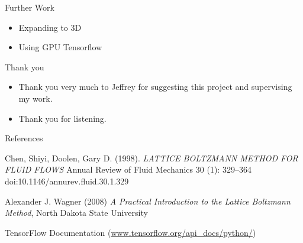 \documentclass{beamer}
\begin{document}
\begin{frame}{Further Work}

\begin{itemize}
    \item Expanding to 3D
    \item Using GPU Tensorflow
\end{itemize}

\end{frame}


\begin{frame}{Thank you}

\begin{itemize}
    \item Thank you very much to Jeffrey for suggesting this project and supervising my work.
    \item Thank you for listening.
\end{itemize}

\end{frame}


\begin{frame}{References}

\begin{thebibliography}{}\tiny

 Chen, Shiyi, Doolen, Gary D. (1998). \emph{LATTICE BOLTZMANN METHOD FOR FLUID FLOWS} Annual Review of Fluid Mechanics 30 (1): 329–364 doi:10.1146/annurev.fluid.30.1.329

 Alexander J. Wagner (2008) \emph{A Practical Introduction to the Lattice Boltzmann Method}, North Dakota State University

 TensorFlow Documentation (\url{www.tensorflow.org/api_docs/python/})

\end{thebibliography}

\end{frame}
\end{document}
